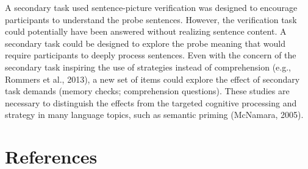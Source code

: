 \documentclass[
  man,floatsintext]{apa7}
\begin{document}
A secondary task used sentence-picture verification was designed to encourage participants to understand the probe sentences. However, the verification task could potentially have been answered without realizing sentence content. A secondary task could be designed to explore the probe meaning that would require participants to deeply process sentences. Even with the concern of the secondary task inspiring the use of strategies instead of comprehension (e.g., Rommers et al., 2013), a new set of items could explore the effect of secondary task demands (memory checks; comprehension questions). These studies are necessary to distinguish the effects from the targeted cognitive processing and strategy in many language topics, such as semantic priming (McNamara, 2005).

\newpage

\hypertarget{references}{%
\section{References}\label{references}}
\end{document}

